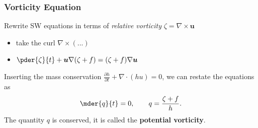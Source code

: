 \documentclass[12pt]{beamer}
\begin{document}
%
%
%
%
\begin{frame}
\frametitle{Vorticity Equation}
Rewrite SW equations in terms of \textit{relative vorticity} $\zeta=\nabla\times\bm{u}$
\vspace{0.3cm}
\begin{itemize}
	\item take the curl $\nabla \times \left(...\right)$
	\item $\pder{\zeta}{t}+\bm{u}\nabla(\zeta+f)=(\zeta+f)\nabla \bm{u}$
\end{itemize}
\vspace{0.5cm}
Inserting the mass conservation $\frac{\partial h}{\partial t}+\nabla\cdot(hu)=0$, we can restate the equations as
\begin{align}
\mder{q}{t}=0,\qquad q=\frac{\zeta+f}{h}\label{pv_conservation}.
\end{align}
\vspace{0.5cm}
The quantity $q$ is conserved, it is called the \textbf{potential vorticity}. 
\end{frame}
\end{document}
